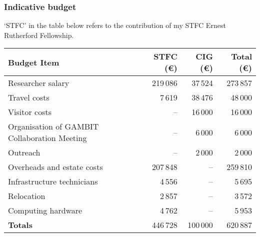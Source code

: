 \documentclass[a4paper,11pt]{article}
\begin{document}
\subsubsection{Indicative budget}

`STFC' in the table below refers to the contribution of my STFC Ernest Rutherford Fellowship.

\vspace{3mm}
\begin{tabular}{|l|r|r|r|}\hline
Budget Item					& STFC ({\sf \euro})	& CIG ({\sf \euro}) 	& Total ({\sf \euro})\\\hline
Researcher salary				& 219\,086	& 37\,524	& 273\,857	\\
Travel costs					& 7\,619	& 38\,476	& 48\,000	\\
Visitor costs					& --		& 16\,000	& 16\,000	\\
Organisation of GAMBIT Collaboration Meeting	& --		& 6\,000	& 6\,000	\\
Outreach					& --		& 2\,000	& 2\,000	\\
Overheads and estate costs			& 207\,848	& --		& 259\,810	\\
Infrastructure technicians			& 4\,556	& --		& 5\,695	\\
Relocation					& 2\,857	& --		& 3\,572	\\
Computing hardware				& 4\,762	& --		& 5\,953	\\\hline
\textbf{Totals}					& 446\,728	& 100\,000	& 620\,887	\\\hline
\end{tabular}
\end{document}
